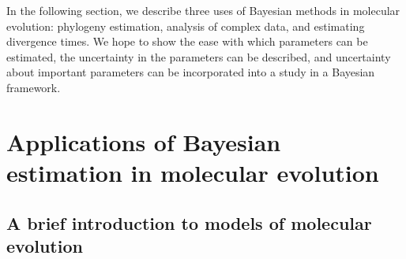 \documentclass{svmult}
\begin{document}
In the following section, we describe three uses of Bayesian methods in molecular evolution:
phylogeny estimation, analysis of complex data, and estimating divergence times.
We hope to show the ease with which parameters can be estimated, the uncertainty in
the parameters can be described, and uncertainty about important parameters can be incorporated
into a study in a Bayesian framework.

\section{Applications of Bayesian estimation in molecular evolution}
\label{sec:3}

\subsection{A brief introduction to models of molecular evolution}
\end{document}
